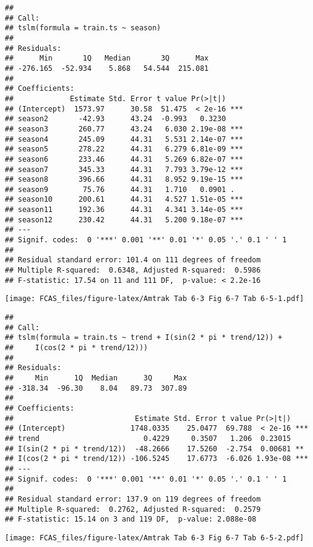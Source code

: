 \documentclass[]{article}
\begin{document}
\begin{verbatim}
## 
## Call:
## tslm(formula = train.ts ~ season)
## 
## Residuals:
##      Min       1Q   Median       3Q      Max 
## -276.165  -52.934    5.868   54.544  215.081 
## 
## Coefficients:
##             Estimate Std. Error t value Pr(>|t|)    
## (Intercept)  1573.97      30.58  51.475  < 2e-16 ***
## season2       -42.93      43.24  -0.993   0.3230    
## season3       260.77      43.24   6.030 2.19e-08 ***
## season4       245.09      44.31   5.531 2.14e-07 ***
## season5       278.22      44.31   6.279 6.81e-09 ***
## season6       233.46      44.31   5.269 6.82e-07 ***
## season7       345.33      44.31   7.793 3.79e-12 ***
## season8       396.66      44.31   8.952 9.19e-15 ***
## season9        75.76      44.31   1.710   0.0901 .  
## season10      200.61      44.31   4.527 1.51e-05 ***
## season11      192.36      44.31   4.341 3.14e-05 ***
## season12      230.42      44.31   5.200 9.18e-07 ***
## ---
## Signif. codes:  0 '***' 0.001 '**' 0.01 '*' 0.05 '.' 0.1 ' ' 1
## 
## Residual standard error: 101.4 on 111 degrees of freedom
## Multiple R-squared:  0.6348, Adjusted R-squared:  0.5986 
## F-statistic: 17.54 on 11 and 111 DF,  p-value: < 2.2e-16
\end{verbatim}

\texttt{[image: FCAS\_files/figure-latex/Amtrak Tab 6-3 Fig 6-7 Tab 6-5-1.pdf]}

\begin{verbatim}
## 
## Call:
## tslm(formula = train.ts ~ trend + I(sin(2 * pi * trend/12)) + 
##     I(cos(2 * pi * trend/12)))
## 
## Residuals:
##     Min      1Q  Median      3Q     Max 
## -318.34  -96.30    8.04   89.73  307.89 
## 
## Coefficients:
##                            Estimate Std. Error t value Pr(>|t|)    
## (Intercept)               1748.0335    25.0477  69.788  < 2e-16 ***
## trend                        0.4229     0.3507   1.206  0.23015    
## I(sin(2 * pi * trend/12))  -48.2666    17.5260  -2.754  0.00681 ** 
## I(cos(2 * pi * trend/12)) -106.5245    17.6773  -6.026 1.93e-08 ***
## ---
## Signif. codes:  0 '***' 0.001 '**' 0.01 '*' 0.05 '.' 0.1 ' ' 1
## 
## Residual standard error: 137.9 on 119 degrees of freedom
## Multiple R-squared:  0.2762, Adjusted R-squared:  0.2579 
## F-statistic: 15.14 on 3 and 119 DF,  p-value: 2.088e-08
\end{verbatim}

\texttt{[image: FCAS\_files/figure-latex/Amtrak Tab 6-3 Fig 6-7 Tab 6-5-2.pdf]}
\end{document}
